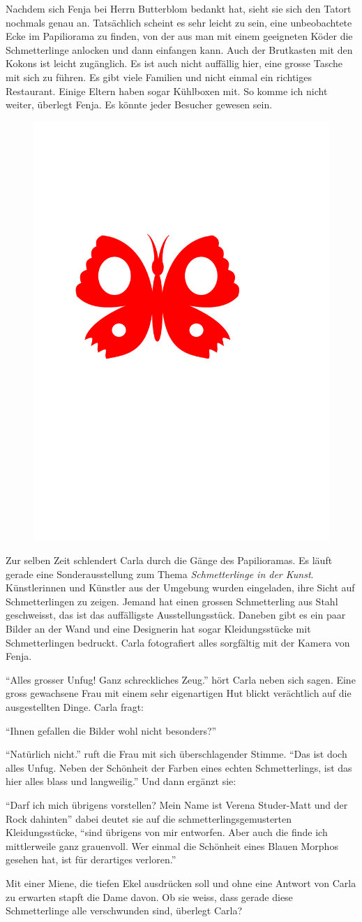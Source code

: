 Nachdem sich Fenja bei Herrn Butterblom bedankt hat, sieht sie sich den Tatort nochmals genau an. Tatsächlich scheint es sehr leicht zu sein, eine unbeobachtete Ecke im Papiliorama zu finden, von der aus man mit einem geeigneten Köder die Schmetterlinge anlocken und dann einfangen kann. Auch der Brutkasten mit den Kokons ist leicht zugänglich. Es ist auch nicht auffällig hier, eine grosse Tasche mit sich zu führen. Es gibt viele Familien und nicht einmal ein richtiges Restaurant. Einige Eltern haben sogar Kühlboxen mit. So komme ich nicht weiter, überlegt Fenja. Es könnte jeder Besucher gewesen sein.
\begin{figure}[H]
\centering
\includegraphics[width=.05\textwidth]{bilder/inkling.pdf}
\end{figure}
Zur selben Zeit schlendert Carla durch die Gänge des Papilioramas. Es läuft gerade eine Sonderausstellung zum Thema \emph{Schmetterlinge in der Kunst}. Künstlerinnen und Künstler aus der Umgebung wurden eingeladen, ihre Sicht auf Schmetterlingen zu zeigen. Jemand hat einen grossen Schmetterling aus Stahl geschweisst, das ist das auffälligste Ausstellungsstück. Daneben gibt es ein paar Bilder an der Wand und eine Designerin hat sogar Kleidungsstücke mit Schmetterlingen bedruckt. Carla fotografiert alles sorgfältig mit der Kamera von Fenja.

\enquote{Alles grosser Unfug! Ganz schreckliches Zeug.} hört Carla neben sich sagen. Eine gross gewachsene Frau mit einem sehr eigenartigen Hut blickt verächtlich auf die ausgestellten Dinge. Carla fragt:

\enquote{Ihnen gefallen die Bilder wohl nicht besonders?}

\enquote{Natürlich nicht.} ruft die Frau mit sich überschlagender Stimme. \enquote{Das ist doch alles Unfug. Neben der Schönheit der Farben eines echten Schmetterlings, ist das hier alles blass und langweilig.} Und dann ergänzt sie:

\enquote{Darf ich mich übrigens vorstellen? Mein Name ist Verena Studer-Matt und der Rock dahinten} dabei deutet sie auf die schmetterlingsgemusterten Kleidungsstücke, \enquote{sind übrigens von mir entworfen. Aber auch die finde ich mittlerweile ganz grauenvoll. Wer einmal die Schönheit eines Blauen Morphos gesehen hat, ist für derartiges verloren.} 


Mit einer Miene, die tiefen Ekel ausdrücken soll und ohne eine Antwort von Carla zu erwarten stapft die Dame davon. Ob sie weiss, dass gerade diese Schmetterlinge alle verschwunden sind, überlegt Carla?

